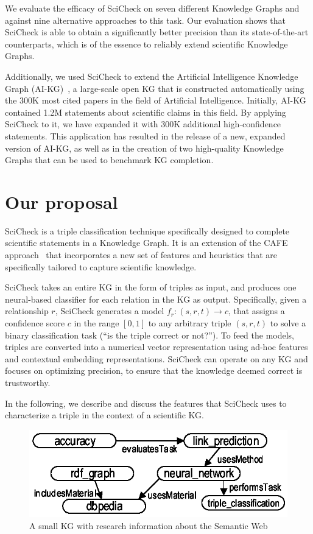 We evaluate the efficacy of SciCheck on seven different Knowledge Graphs and against nine alternative approaches to this task. Our evaluation shows that SciCheck is able to obtain a significantly better precision than its state-of-the-art counterparts, which is of the essence to reliably extend scientific Knowledge Graphs.

Additionally, we used SciCheck to extend the Artificial Intelligence Knowledge Graph (AI-KG)~\cite{dessi2020aikg}, a large-scale open KG that is constructed automatically using the 300K most cited papers in the field of Artificial Intelligence. Initially, AI-KG contained 1.2M statements about scientific claims in this field. By applying SciCheck to it, we have expanded it with 300K additional high-confidence statements. This application has resulted in the release of a new, expanded version of AI-KG, as well as in the creation of two high-quality Knowledge Graphs that can be used to benchmark KG completion.

\section{Our proposal}\label{sec:sci-proposal}
SciCheck is a triple classification technique specifically designed to complete scientific statements in a Knowledge Graph. It is an extension of the CAFE approach~\cite{borrego2021} that incorporates a new set of features and heuristics that are specifically tailored to capture scientific knowledge. 

SciCheck takes an entire KG in the form of triples as input, and produces one neural-based classifier for each relation in the KG as output. Specifically, given a relationship $r$, SciCheck generates a model $f_r : (s,r,t) \rightarrow c$, that assigns a confidence score $c$ in the range $[0,1]$ to any arbitrary triple $(s,r,t)$ to solve a binary classification task (``is the triple correct or not?''). To feed the models, triples are converted into a numerical vector representation using ad-hoc features and contextual embedding representations. SciCheck can operate on any KG and focuses on optimizing precision, to ensure that the knowledge deemed correct is trustworthy.

In the following, we describe and discuss the features that SciCheck uses to characterize a triple in the context of a scientific KG.

\begin{figure}[!htp]
    \centering
    \includegraphics[width=.55\textwidth]{fig/scicheck/example_kg}
    \caption{A small KG with research information about the Semantic Web}
    \label{fig:example-kg-sw}
\end{figure}

